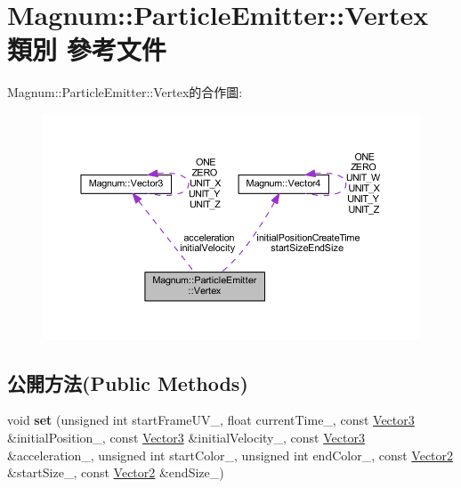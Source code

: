 \hypertarget{class_magnum_1_1_particle_emitter_1_1_vertex}{}\section{Magnum\+:\+:Particle\+Emitter\+:\+:Vertex 類別 參考文件}
\label{class_magnum_1_1_particle_emitter_1_1_vertex}


Magnum\+:\+:Particle\+Emitter\+:\+:Vertex的合作圖\+:\nopagebreak
\begin{figure}[H]
\begin{center}
\leavevmode
\includegraphics[width=350pt]{class_magnum_1_1_particle_emitter_1_1_vertex__coll__graph}
\end{center}
\end{figure}
\subsection*{公開方法(Public Methods)}
\begin{DoxyCompactItemize}
\item 
void {\bfseries set} (unsigned int start\+Frame\+U\+V\+\_\+, float current\+Time\+\_\+, const \hyperlink{class_magnum_1_1_vector3}{Vector3} \&initial\+Position\+\_\+, const \hyperlink{class_magnum_1_1_vector3}{Vector3} \&initial\+Velocity\+\_\+, const \hyperlink{class_magnum_1_1_vector3}{Vector3} \&acceleration\+\_\+, unsigned int start\+Color\+\_\+, unsigned int end\+Color\+\_\+, const \hyperlink{class_magnum_1_1_vector2}{Vector2} \&start\+Size\+\_\+, const \hyperlink{class_magnum_1_1_vector2}{Vector2} \&end\+Size\+\_\+)\hypertarget{class_magnum_1_1_particle_emitter_1_1_vertex_a914b47ce73e61a18f6f7ac1725491286}{}\label{class_magnum_1_1_particle_emitter_1_1_vertex_a914b47ce73e61a18f6f7ac1725491286}

\end{DoxyCompactItemize}
